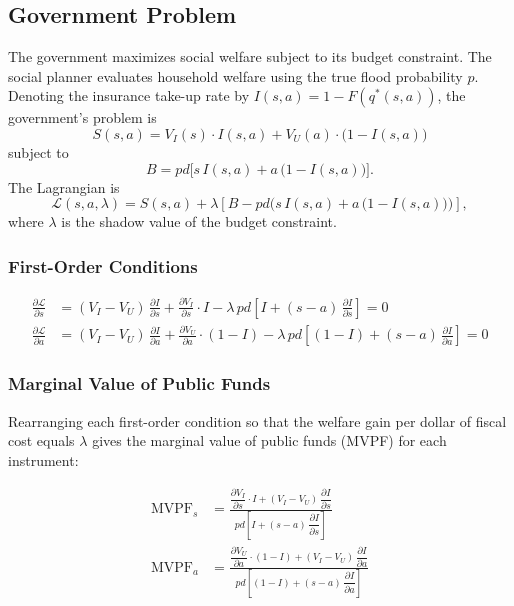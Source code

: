 \documentclass[12pt]{article}
\begin{document}
\subsection{Government Problem}

The government maximizes social welfare subject to its budget constraint. The social planner evaluates household welfare using the true flood probability $p$. Denoting the insurance take-up rate by $I(s,a) = 1 - F(q^*(s,a))$, the government's problem is
\begin{equation}
    S(s,a) = V_I(s)\cdot I(s,a) + V_U(a)\cdot\bigl(1-I(s,a)\bigr) \label{eq:welfare}
\end{equation}
subject to
\begin{equation}
    B = pd\bigl[s\,I(s,a) + a\,\bigl(1-I(s,a)\bigr)\bigr]. \label{eq:budget}
\end{equation}
The Lagrangian is
\[
    \mathcal{L}(s,a,\lambda) = S(s,a) + \lambda\!\left[B - pd\bigl(s\,I(s,a) + a\,\bigl(1-I(s,a)\bigr)\bigr)\right],
\]
where $\lambda$ is the shadow value of the budget constraint.

\subsubsection*{First-Order Conditions}

\begin{align}
    \frac{\partial\mathcal{L}}{\partial s} &=
        (V_I-V_U)\,\frac{\partial I}{\partial s}
        + \frac{\partial V_I}{\partial s}\cdot I
        - \lambda\,pd\!\left[
            I + (s-a)\,\frac{\partial I}{\partial s}
        \right] = 0 \label{eq:foc_s} \\[12pt]
    \frac{\partial\mathcal{L}}{\partial a} &=
        (V_I-V_U)\,\frac{\partial I}{\partial a}
        + \frac{\partial V_U}{\partial a}\cdot(1-I)
        - \lambda\,pd\!\left[
            (1-I) + (s-a)\,\frac{\partial I}{\partial a}
        \right] = 0 \label{eq:foc_a}
\end{align}

\subsubsection*{Marginal Value of Public Funds}

Rearranging each first-order condition so that the welfare gain per dollar of fiscal cost equals $\lambda$ gives the marginal value of public funds (MVPF) for each instrument:

\begin{align}
    \text{MVPF}_s &= \frac{
        \dfrac{\partial V_I}{\partial s}\cdot I
         +  (V_I-V_U)\,\dfrac{\partial I}{\partial s}
    }{
        pd\!\left[I + (s-a)\,\dfrac{\partial I}{\partial s}\right]
    } \label{eq:mvpf_s_vf} \\[14pt]
    \text{MVPF}_a &= \frac{
        \dfrac{\partial V_U}{\partial a}\cdot(1-I)
         + (V_I-V_U)\,\dfrac{\partial I}{\partial a}
    }{
        pd\!\left[(1-I) + (s-a)\,\dfrac{\partial I}{\partial a}\right]
    } \label{eq:mvpf_a_vf}
\end{align}
\end{document}
